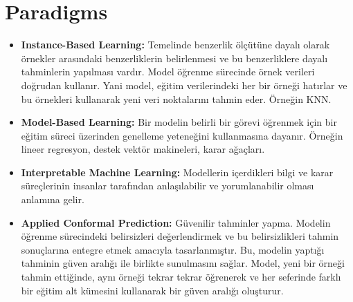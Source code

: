 \section{Paradigms}

\begin{itemize}
    \item \textbf{Instance-Based Learning:} Temelinde benzerlik ölçütüne dayalı olarak örnekler arasındaki benzerliklerin belirlenmesi ve bu benzerliklere dayalı tahminlerin yapılması vardır. Model öğrenme sürecinde örnek verileri doğrudan kullanır. Yani model, eğitim verilerindeki her bir örneği hatırlar ve bu örnekleri kullanarak yeni veri noktalarını tahmin eder. Örneğin KNN.
    \item \textbf{Model-Based Learning:} Bir modelin belirli bir görevi öğrenmek için bir eğitim süreci üzerinden genelleme yeteneğini kullanmasına dayanır. Örneğin lineer regresyon, destek vektör makineleri, karar ağaçları.
    \item \textbf{Interpretable Machine Learning:} Modellerin içerdikleri bilgi ve karar süreçlerinin insanlar tarafından anlaşılabilir ve yorumlanabilir olması anlamına gelir.
    \item \textbf{Applied Conformal Prediction:} Güvenilir tahminler yapma. Modelin öğrenme sürecindeki belirsizleri değerlendirmek ve bu belirsizlikleri tahmin sonuçlarına entegre etmek amacıyla tasarlanmıştır. Bu, modelin yaptığı tahminin güven aralığı ile birlikte sunulmasını sağlar. Model, yeni bir örneği tahmin ettiğinde, aynı örneği tekrar tekrar öğrenerek ve her seferinde farklı bir eğitim alt kümesini kullanarak bir güven aralığı oluşturur.
\end{itemize}

\newpage